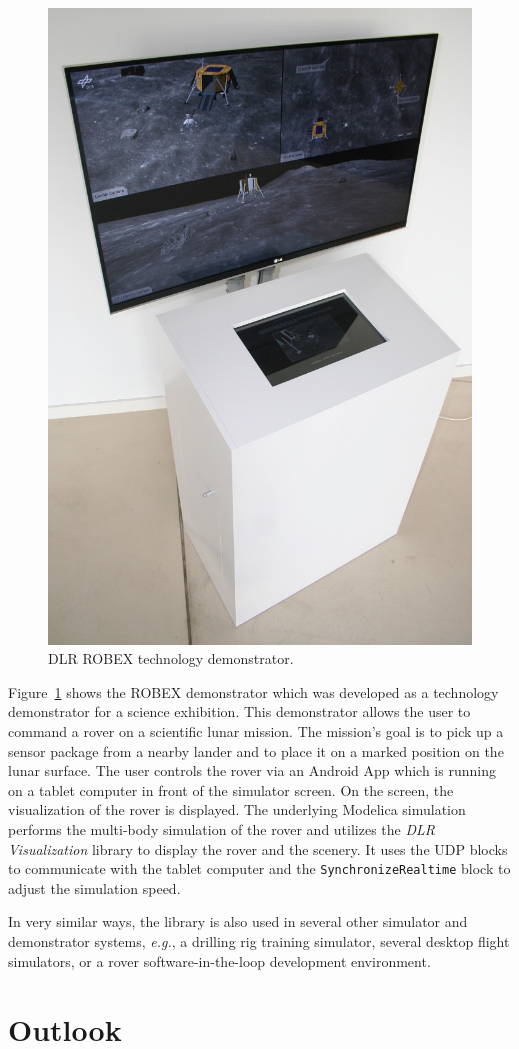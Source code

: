 \documentclass{resources/modelica}
\newcommand{\modelica}[1]{\lstinline[language=modelica]|#1|}
\newcommand{\BTHI}[1]{}
\newcommand{\TBEU}[1]{}
\begin{document}
\begin{figure}[tb]
  \centering
  \includegraphics[width=0.5\columnwidth]{figures/DLRROBEX}
  \caption{DLR ROBEX technology demonstrator.}
  \label{fig:DLRROBEX}
\end{figure}
\TBEU{Tobias: Do you have any citable references for the application or exhibition?}
Figure~\ref{fig:DLRROBEX} shows the ROBEX demonstrator which was developed as a technology demonstrator
for a science exhibition.
This demonstrator allows the user to command a rover
on a scientific lunar mission. The mission's goal is to pick up a sensor package from a nearby
lander and to place it on a marked position on the lunar surface. The user
controls the rover via an Android App which is running on a tablet computer in front of
the simulator screen.
\TBEU{Bernhard: Add link to Android in footnote?}On the screen, the visualization of the rover is displayed.
The underlying Modelica simulation performs the multi-body simulation of the
rover and utilizes the \emph{DLR Visualization} library to display the rover and the
scenery.
\TBEU{Tobias: Is the Android App open-source and can be added as link in a footnote?}It uses the UDP blocks to communicate with the tablet computer and the
\modelica{SynchronizeRealtime} block to adjust the simulation speed.

In very similar ways, the library is also used in several other simulator and
demonstrator systems, \textit{e.g.}, a drilling rig training simulator, several
desktop flight simulators, or a rover software-in-the-loop development
environment.

\section{Outlook}
\BTHI{TODO: Bernhard, Thomas, Volker}
\end{document}
